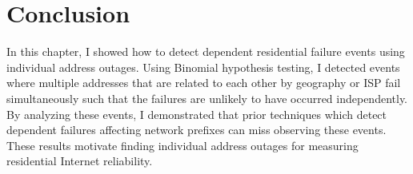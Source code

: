 
\section{Conclusion}

In this chapter, I showed how to detect dependent residential failure events using individual address outages. Using Binomial hypothesis testing, I detected events where multiple addresses that are related to each other by geography or ISP fail simultaneously such that the failures are unlikely to have occurred independently. By analyzing these events, I demonstrated that prior techniques which detect dependent failures affecting network prefixes can miss observing these events. These results motivate finding individual address outages for measuring residential Internet reliability.